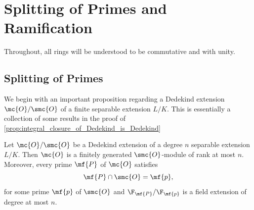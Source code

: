 \chapter{Splitting of Primes and Ramification}
  Throughout, all rings will be understood to be commutative and with unity.
  \section{Splitting of Primes}
    We begin with an important proposition regarding a Dedekind extension \(\mc{O}/\smc{O}\) of a finite separable extension \(L/K\). This is essentially a collection of some results in the proof of \cref{prop:integral_closure_of_Dedekind_is_Dedekind}

    \begin{proposition}\label{prop:Dedekind_extension_facts}
      Let \(\mc{O}/\smc{O}\) be a Dedekind extension of a degree \(n\) separable extension \(L/K\). Then \(\mc{O}\) is a finitely generated \(\smc{O}\)-module of rank at most \(n\). Moreover, every prime \(\mf{P}\) of \(\mc{O}\) satisfies
      \[
        \mf{P} \cap \smc{O} = \mf{p},
      \]
      for some prime \(\mf{p}\) of \(\smc{O}\) and \(\F_{\mf{P}}/\F_{\mf{p}}\) is a field extension of degree at most \(n\).
    \end{proposition}
